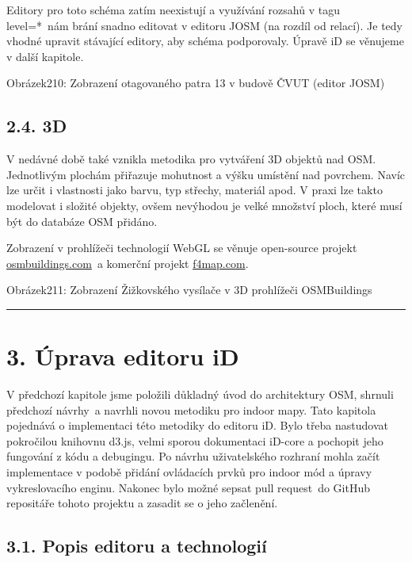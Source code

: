 Editory pro toto schéma zatím neexistují a využívání rozsahů v tagu level=*~nám brání snadno editovat v editoru JOSM (na rozdíl od relací). Je tedy vhodné upravit stávající editory, aby schéma podporovaly. Úpravě iD se věnujeme v další kapitole.

Obrázek210: Zobrazení otagovaného patra 13 v budově ČVUT (editor JOSM)

\section{2.4. 3D}\label{d}

V nedávné době také vznikla metodika pro vytváření 3D objektů nad OSM. Jednotlivým plochám přiřazuje mohutnost a výšku umístění nad povrchem. Navíc lze určit i vlastnosti jako barvu, typ střechy, materiál apod. V praxi lze takto modelovat i složité objekty, ovšem nevýhodou je velké množství ploch, které musí být do databáze OSM přidáno.

Zobrazení v prohlížeči technologií WebGL se věnuje open-source projekt \href{}{osmbuildings.com}~a komerční projekt \href{}{f4map.com}.

Obrázek211: Zobrazení Žižkovského vysílače v 3D prohlížeči OSMBuildings

\begin{center}\rule{0.5\linewidth}{\linethickness}\end{center}

\chapter{3. Úprava editoru iD}\label{uxfaprava-editoru-id}

V předchozí kapitole jsme položili důkladný úvod do architektury OSM, shrnuli předchozí návrhy~a navrhli novou metodiku pro indoor mapy. Tato kapitola pojednává o implementaci této metodiky do editoru iD. Bylo třeba nastudovat pokročilou knihovnu d3.js, velmi sporou dokumentaci iD-core a pochopit jeho fungování z kódu a debugingu. Po návrhu uživatelského rozhraní mohla začít implementace v podobě přidání ovládacích prvků pro indoor mód a úpravy vykreslovacího enginu. Nakonec bylo možné sepsat pull request~do GitHub repositáře tohoto projektu a zasadit se o jeho začlenění.

\section{3.1. Popis editoru a technologií}\label{popis-editoru-a-technologiuxed}


